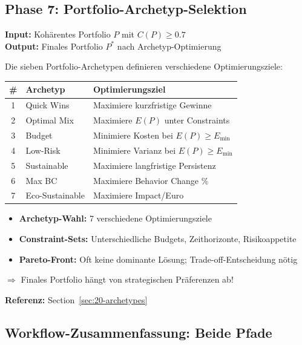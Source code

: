 \subsection{Phase 7: Portfolio-Archetyp-Selektion}
\label{sec:20-phase7}

\textbf{Input:} Kohärentes Portfolio $P$ mit $C(P) \geq 0.7$\\
\textbf{Output:} Finales Portfolio $P^*$ nach Archetyp-Optimierung

Die sieben Portfolio-Archetypen definieren verschiedene Optimierungsziele:

\begin{center}
\renewcommand{\arraystretch}{1.2}
\footnotesize
\begin{tabular}{@{}clp{4.5cm}@{}}
\toprule
\textbf{\#} & \textbf{Archetyp} & \textbf{Optimierungsziel} \\
\midrule
1 & Quick Wins & Maximiere kurzfristige Gewinne \\
2 & Optimal Mix & Maximiere $E(P)$ unter Constraints \\
3 & Budget & Minimiere Kosten bei $E(P) \geq E_{\min}$ \\
4 & Low-Risk & Minimiere Varianz bei $E(P) \geq E_{\min}$ \\
5 & Sustainable & Maximiere langfristige Persistenz \\
6 & Max BC & Maximiere Behavior Change \% \\
7 & Eco-Sustainable & Maximiere Impact/Euro \\
\bottomrule
\end{tabular}
\end{center}

\begin{tcolorbox}[colback=orange!5!white, colframe=orange!75!black,
    title=\textbf{Variabilität in Phase 7}]
\begin{itemize}[nosep]
\item \textbf{Archetyp-Wahl:} 7 verschiedene Optimierungsziele
\item \textbf{Constraint-Sets:} Unterschiedliche Budgets, Zeithorizonte, Risikoappetite
\item \textbf{Pareto-Front:} Oft keine dominante Lösung; Trade-off-Entscheidung nötig
\end{itemize}
$\Rightarrow$ Finales Portfolio hängt von strategischen Präferenzen ab!
\end{tcolorbox}

\textbf{Referenz:} Section~\ref{sec:20-archetypes}

\subsection{Workflow-Zusammenfassung: Beide Pfade}
\label{sec:20-workflow-summary}

